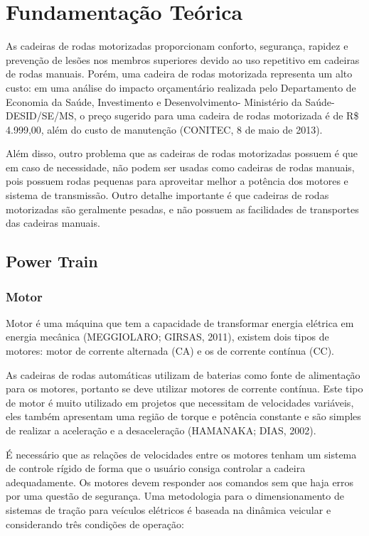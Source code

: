 \chapter{Fundamentação Teórica}\label{cap:fundamentacao_teorica}


As cadeiras de rodas motorizadas proporcionam conforto, segurança, rapidez e prevenção de lesões nos membros superiores devido ao uso repetitivo em cadeiras de rodas manuais. Porém, uma cadeira de rodas motorizada representa um alto custo: em uma análise do impacto orçamentário realizada pelo Departamento de Economia da Saúde, Investimento e Desenvolvimento- Ministério da Saúde-DESID/SE/MS, o preço sugerido para uma cadeira de rodas motorizada é de R\$ 4.999,00, além do custo de manutenção (CONITEC, 8 de maio de 2013).

Além disso, outro problema que as cadeiras de rodas motorizadas possuem é que em caso de necessidade, não podem ser usadas como cadeiras de rodas manuais, pois possuem rodas pequenas para aproveitar melhor a potência dos motores e sistema de transmissão. Outro detalhe importante é que cadeiras de rodas motorizadas são geralmente pesadas, e não possuem as facilidades de transportes das cadeiras manuais.


\section{Power Train}

\subsection{Motor}

Motor é uma máquina que tem a capacidade de transformar energia elétrica em energia mecânica (MEGGIOLARO; GIRSAS, 2011), existem dois tipos de motores: motor de corrente alternada (CA) e os de corrente contínua (CC).

As cadeiras de rodas automáticas utilizam de baterias como fonte de alimentação para os motores, portanto se deve utilizar motores de corrente contínua. Este tipo de motor é muito utilizado em projetos que necessitam de velocidades variáveis, eles também apresentam uma região de torque e potência constante e são simples de realizar a aceleração e a desaceleração (HAMANAKA; DIAS, 2002).

É necessário que as relações de velocidades entre os motores tenham um sistema de controle rígido de forma que o usuário consiga controlar a cadeira adequadamente. Os motores devem responder aos comandos sem que haja erros por uma questão de segurança. Uma metodologia para o dimensionamento de sistemas de tração para veículos elétricos é baseada na dinâmica veicular e considerando três condições de operação:

